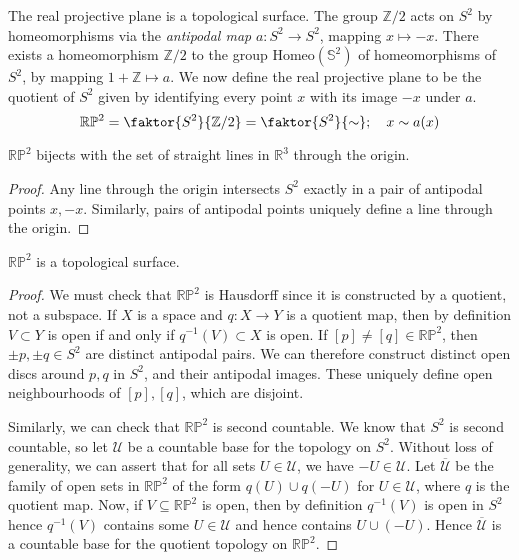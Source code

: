 \begin{example}
	The real projective plane is a topological surface.
	The group \( \mathbb Z / 2 \) acts on \( S^2 \) by homeomorphisms via the \textit{antipodal map} \( a \colon S^2 \to S^2 \), mapping \( x \mapsto -x \).
	There exists a homeomorphism \( \mathbb Z / 2 \) to the group \( \mathrm{Homeo}(\mathbb S^2) \) of homeomorphisms of \( S^2 \), by mapping \( 1 + \mathbb Z \mapsto a \).
	We now define the real projective plane to be the quotient of \( S^2 \) given by identifying every point \( x \) with its image \( -x \) under \( a \).
	\[
		\mathbb R \mathbb P^2 = \faktor{S^2}{\mathbb Z/2} = \faktor{S^2}{\sim};\quad x \sim a(x)
	\]
	\begin{lemma}
		\( \mathbb R \mathbb P^2 \) bijects with the set of straight lines in \( \mathbb R^3 \) through the origin.
	\end{lemma}
	\begin{proof}
		Any line through the origin intersects \( S^2 \) exactly in a pair of antipodal points \( x, -x \).
		Similarly, pairs of antipodal points uniquely define a line through the origin.
	\end{proof}
	\begin{lemma}
		\( \mathbb R \mathbb P^2 \) is a topological surface.
	\end{lemma}
	\begin{proof}
		We must check that \( \mathbb R \mathbb P^2 \) is Hausdorff since it is constructed by a quotient, not a subspace.
		If \( X \) is a space and \( q \colon X \to Y \) is a quotient map, then by definition \( V \subset Y \) is open if and only if \( q^{-1}(V) \subset X \) is open.
		If \( [p] \neq [q] \in \mathbb R \mathbb P^2 \), then \( \pm p, \pm q \in S^2 \) are distinct antipodal pairs.
		We can therefore construct distinct open discs around \( p, q \) in \( S^2 \), and their antipodal images.
		These uniquely define open neighbourhoods of \( [p], [q] \), which are disjoint.

		Similarly, we can check that \( \mathbb R \mathbb P^2 \) is second countable.
		We know that \( S^2 \) is second countable, so let \( \mathcal U \) be a countable base for the topology on \( S^2 \).
		Without loss of generality, we can assert that for all sets \( U \in \mathcal U \), we have \( -U \in \mathcal U \).
		Let \( \overline{\mathcal U} \) be the family of open sets in \( \mathbb R \mathbb P^2 \) of the form \( q(U) \cup q(-U) \) for \( U \in \mathcal U \), where \( q \) is the quotient map.
		Now, if \( V \subseteq \mathbb R \mathbb P^2 \) is open, then by definition \( q^{-1}(V) \) is open in \( S^2 \) hence \( q^{-1}(V) \) contains some \( U \in \mathcal U \) and hence contains \( U \cup (-U) \).
		Hence \( \overline{\mathcal U} \) is a countable base for the quotient topology on \( \mathbb R \mathbb P^2 \).


\end{proof}
\end{example}
